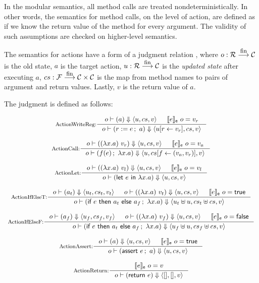 In the modular semantics, all method calls are treated
nondeterministically. In other words, the semantics for method calls,
on the level of action, are defined as if we know the return value of
the method for every argument. The validity of such assumptions are
checked on higher-level semantics.

The semantics for actions have a form of a judgment relation
, where $o : \mathcal{R} \stackrel{\textrm{\footnotesize{fin}}}{\longrightarrow} \mathcal{C}{}$ is the old state, $a$
is the target action, $u : \mathcal{R} \stackrel{\textrm{\footnotesize{fin}}}{\longrightarrow} \mathcal{C}{}$ is the \emph{updated state}
after executing $a$, $cs : \mathcal{F} \stackrel{\textrm{\footnotesize{fin}}}{\longrightarrow} \mathcal{C} \times \mathcal{C}{}$ is the map from method names to
pairs of argument and return values. Lastly, $v$ is the return value
of $a$.

\begin{definition}
  \label{def-semaction}
  The judgment  is defined as follows:
  \begin{center}
    \begin{math}
      \begin{array}{c}
        \inference[ActionWriteReg:]{\semact{o}{a}{u}{cs}{v} & \semexpr{e}{o} = v_r}
                  {\semact{o}{\actwrite{r}{e}{a}}{\stupd{u}{r}{v_r}}{cs}{v}} \\
        \mbox{} \\
        \inference[ActionCall:]{\semact{o}{(\lambda x.a)\ v_r}{u}{cs}{v} & \semexpr{e}{o} = v_a}
                  {\semact{o}{\actcall{x}{f}{e}{a}}{u}{\lblupd{cs}{f}{(v_a, v_r)}}{v}} \\
        \mbox{} \\
        \inference[ActionLet:]{\semact{o}{(\lambda x.a)\ v_l}{u}{cs}{v} & \semexpr{e}{o} = v_l}
                  {\semact{o}{\actlet{e}{x}{a}}{u}{cs}{v}} \\
        \mbox{} \\
        \inference[ActionIfElseT:]{\semact{o}{a_t}{u_t}{cs_t}{v_t} &
          \semact{o}{(\lambda x.a)\ v_t}{u}{cs}{v} &
          \semexpr{e}{o} = \btrue{}}
                  {\semact{o}{\actifelse{e}{a_t}{a_f}{x}{a}}{\splus{u_t}{u}}{\splus{cs_t}{cs}}{v}} \\
        \mbox{} \\
        \inference[ActionIfElseF:]{\semact{o}{a_f}{u_f}{cs_f}{v_f} &
          \semact{o}{(\lambda x.a)\ v_f}{u}{cs}{v} &
          \semexpr{e}{o} = \bfalse{}}
                  {\semact{o}{\actifelse{e}{a_t}{a_f}{x}{a}}{\splus{u_f}{u}}{\splus{cs_f}{cs}}{v}} \\
        \mbox{} \\
        \inference[ActionAssert:]{\semact{o}{a}{u}{cs}{v} & \semexpr{e}{o} = \btrue{}}
                  {\semact{o}{\actassert{e}{a}}{u}{cs}{v}} \\
        \mbox{} \\
        \inference[ActionReturn:]{\semexpr{e}{o} = v}
                  {\semact{o}{\actret{e}}{\emptymap{}}{\emptymap{}}{v}} \\
        \mbox{} \\
      \end{array}
    \end{math}
  \end{center}
\end{definition}

